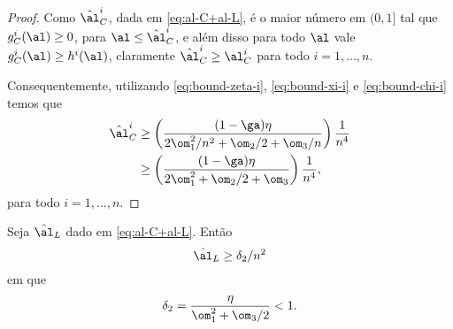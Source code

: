 \begin{proof}
Como $\nextal^{i}_{C}$, dada em \eqref{eq:al-C+al-L}, é o maior número em $(0,1]$ tal que $g_{C}^{i}(\al)\geq 0$, para $\al\leq\nextal^{i}_{C}$, e além disso para todo $\al$ vale $g_{C}^{i}(\al) \geq h^{i}(\al)$, claramente $\nextal^{i}_{C} \geq  \al_{C}^i$ para todo $i=1,\ldots,n$.

Consequentemente, utilizando \eqref{eq:bound-zeta-i}, \eqref{eq:bound-xi-i} e \eqref{eq:bound-chi-i} temos que 
\[
\begin{aligned}
\nextal_{C}^i & \geq \left(\dfrac{(1-\ga)\eta}{2\om_{1}^{2}/n^{2} + \om_{2}/2 + \om_{3}/n  }\right)\dfrac{1}{n^{4}} \\			  & \geq \left(\dfrac{(1-\ga)\eta}{2\om_{1}^{2} + \om_{2}/2 + \om_{3}  }\right)\dfrac{1}{n^{4}},
\end{aligned}
\]
 para todo $i=1,\ldots,n$. 
 \end{proof}






\begin{lema}\label{lemma:alL_delta-2}
Seja $\nextal_{L}$ dado em \eqref{eq:al-C+al-L}. Então 
\[
\nextal_{L} \geq \delta_{2}/n^{2}
\]
em que 
\[
\delta_{2} = \frac{\eta }{\om_{1}^{2} + \om_{3}/2} < 1.
\]
\end{lema}


